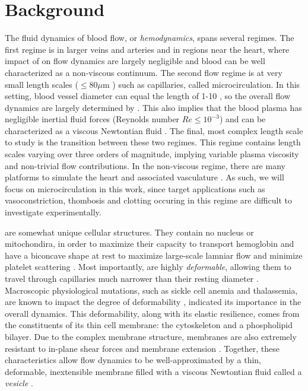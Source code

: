\section{Background}
The fluid dynamics of blood flow, or \textit{hemodynamics}, spans several regimes. 
The first regime is in larger veins and arteries and in regions near the heart, where impact of \rbcs on flow dynamics are largely negligible and blood can be well characterized as a non-viscous continuum. 
The second flow regime is at very small length scales ($\leq 80 \mu$m \cite{potter1983capillary}) such as capillaries, called microcirculation.
In this setting, blood vessel diameter can equal the length of 1-10 \rbcs \cite{potter1983capillary,linden2012hematopoietic}, so the overall flow dynamics are largely determined by \rbcs. 
This also implies that the blood plasma has negligible inertial fluid forces (Reynolds number $Re \leq 10^{-3}$) and can be characterized as a viscous Newtontian fluid \cite{cortinovis2006capillary}.
The final, most complex length scale to study is the transition between these two regimes.
This regime contains length scales varying over three orders of magnitude, implying variable plasma viscosity and non-trivial \rbc flow contributions.
In the non-viscous regime, there are many platforms to simulate the heart and associated vasculature \cite{randles2015massively,vigmond2008effect,peskin1977numerical,griffith2012immersed}.
As such, we will focus on microcirculation in this work, since target applications such as vasoconstriction, thombosis and clotting occuring in this regime are difficult to investigate experimentally.

\rbcs are somewhat unique cellular structures. 
They contain no nucleus or mitochondira, in order to maximize their capacity to transport hemoglobin \cite{zhang2011red} and have a biconcave shape at rest to maximize large-scale lamniar flow and minimize platelet scattering \cite{uzoigwe2006human}.
Most importantly, \rbcs are highly \textit{deformable}, allowing them to travel through capillaries much narrower than their resting diameter \cite{huisjes2018squeezing}.
Macroscopic physiological mutations, such as sickle cell anemia and thalassemia, are known to impact the degree of \rbc deformability \cite{huisjes2018squeezing}, indicated its importance in the overall dynamics.
This deformability, along with its elastic resilience, comes from the constituents of its thin cell membrane: the cytoskeleton and a phospholipid bilayer.
Due to the complex membrane structure, \rbc membranes are also extremely resistant to in-plane shear forces and membrane extension \cite{lee2008theoretical}.
Together, these characteristics allow \rbc flow dynamics to be well-approximated by a thin, deformable, inextensible membrane filled with a viscous Newtontian fluid called a \textit{vesicle} \cite{sackmann1996supported,kraus1996fluid}.

